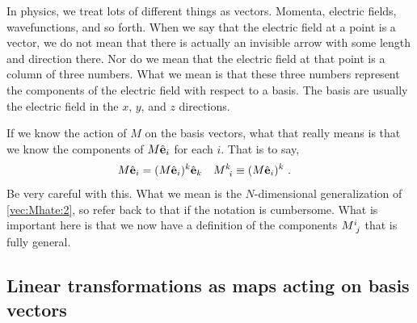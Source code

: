 \documentclass[12pt]{article}
\begin{document}
In physics, we treat lots of different things as vectors. Momenta, electric fields, wavefunctions, and so forth. When we say that the electric field at a point is a vector, we do not mean that there is actually an invisible arrow with some length and direction there. Nor do we mean that the electric field at that point is a column of three numbers. What we mean is that these three numbers represent the components of the electric field with respect to a basis. The basis are usually the electric field in the $x$, $y$, and $z$ directions. 


If we know the action of $M$ on the basis vectors, what that really means is that we know the components of $M{\hat{\mathbf{e}}}_i$ for each $i$. That is to say, 
\begin{align}
    M{\bas{e}}_i &= (M{\bas{e}}_i)^k {\bas{e}}_k 
    &
    M\aij{k}{i} &\equiv (M{\bas{e}}_i)^k
    \ .
\end{align}
Be very careful with this. What we mean is the $N$-dimensional generalization of \eqref{vec:Mhate:2}, so refer back to that if the notation is cumbersome. What is important here is that we now have a definition of the components $M\aij{i}{j}$ that is fully general. 



\subsection{Linear transformations as maps acting on basis vectors}
\end{document}
